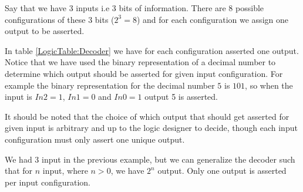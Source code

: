             Say that we have 3 inputs i.e 3 bits of information. There are 8 possible configurations of these 3 bits ($2^{3}=8$) and for each configuration we assign one output to be asserted. 
            
            In table \ref{LogicTable:Decoder} we have for each configuration asserted one output. Notice that we have used the binary representation of a decimal number to determine which output should be asserted for given input configuration. For example the binary representation for the decimal number $5$ is $101$, so when the input is $In2=1$, $In1=0$ and $In0=1$ output 5 is asserted. 
            
            It should be noted that the choice of which output that should get asserted for given input is arbitrary and up to the logic designer to decide, though each input configuration must only assert one unique output.
            
            We had 3 input in the previous example, but we can generalize the decoder such that for $n$ input, where $n > 0$,  we have $2^{n}$ output. Only one output is asserted per input configuration. 
            
